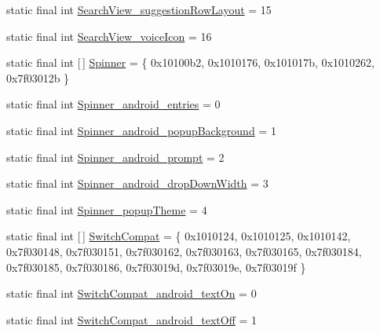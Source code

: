 \begin{DoxyCompactItemize}
\item 
static final int \mbox{\hyperlink{classandroid_1_1support_1_1v7_1_1appcompat_1_1_r_1_1styleable_a8fe9e4753b8239544327f966749da2af}{Search\+View\+\_\+suggestion\+Row\+Layout}} = 15
\item 
static final int \mbox{\hyperlink{classandroid_1_1support_1_1v7_1_1appcompat_1_1_r_1_1styleable_acf6e3bc9a9fa2ff39a17969a13f185d1}{Search\+View\+\_\+voice\+Icon}} = 16
\item 
static final int \mbox{[}$\,$\mbox{]} \mbox{\hyperlink{classandroid_1_1support_1_1v7_1_1appcompat_1_1_r_1_1styleable_a63a8e6de3d44afcd176eaa79214fd8a5}{Spinner}} = \{ 0x10100b2, 0x1010176, 0x101017b, 0x1010262, 0x7f03012b \}
\item 
static final int \mbox{\hyperlink{classandroid_1_1support_1_1v7_1_1appcompat_1_1_r_1_1styleable_a783677be4dd7b37c640a78e9e89c9a22}{Spinner\+\_\+android\+\_\+entries}} = 0
\item 
static final int \mbox{\hyperlink{classandroid_1_1support_1_1v7_1_1appcompat_1_1_r_1_1styleable_a756e7d7ebf3758cf9548f0450c558c18}{Spinner\+\_\+android\+\_\+popup\+Background}} = 1
\item 
static final int \mbox{\hyperlink{classandroid_1_1support_1_1v7_1_1appcompat_1_1_r_1_1styleable_a2b020d064f01dd162a9186546be615ed}{Spinner\+\_\+android\+\_\+prompt}} = 2
\item 
static final int \mbox{\hyperlink{classandroid_1_1support_1_1v7_1_1appcompat_1_1_r_1_1styleable_a636540870b1adf3ad212d48846883084}{Spinner\+\_\+android\+\_\+drop\+Down\+Width}} = 3
\item 
static final int \mbox{\hyperlink{classandroid_1_1support_1_1v7_1_1appcompat_1_1_r_1_1styleable_ab9af518c5e821e5b40a299636324b4e2}{Spinner\+\_\+popup\+Theme}} = 4
\item 
static final int \mbox{[}$\,$\mbox{]} \mbox{\hyperlink{classandroid_1_1support_1_1v7_1_1appcompat_1_1_r_1_1styleable_aabe688560752254f2288f3eaf9439737}{Switch\+Compat}} = \{ 0x1010124, 0x1010125, 0x1010142, 0x7f030148, 0x7f030151, 0x7f030162, 0x7f030163, 0x7f030165, 0x7f030184, 0x7f030185, 0x7f030186, 0x7f03019d, 0x7f03019e, 0x7f03019f \}
\item 
static final int \mbox{\hyperlink{classandroid_1_1support_1_1v7_1_1appcompat_1_1_r_1_1styleable_a1d0fcc134e8b81cc9141e37b8246b242}{Switch\+Compat\+\_\+android\+\_\+text\+On}} = 0
\item 
static final int \mbox{\hyperlink{classandroid_1_1support_1_1v7_1_1appcompat_1_1_r_1_1styleable_ad9b521772e16cac1f87dfe01701ec275}{Switch\+Compat\+\_\+android\+\_\+text\+Off}} = 1

\end{DoxyCompactItemize}

